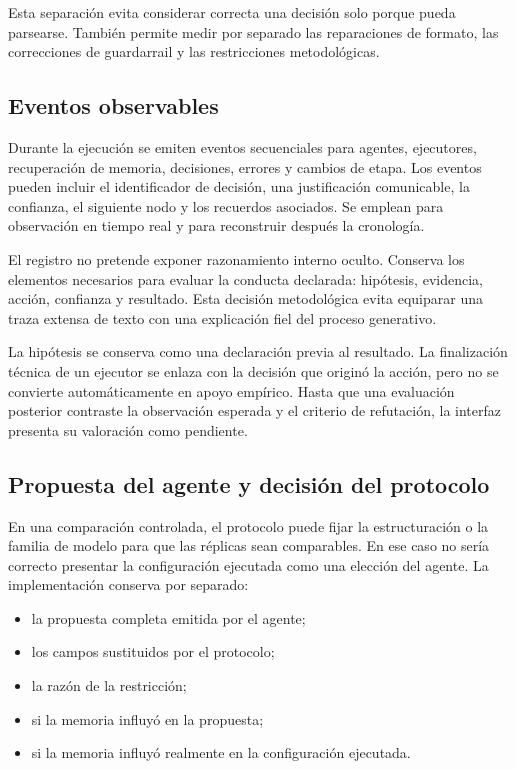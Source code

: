 Esta separación evita considerar correcta una decisión solo porque pueda
parsearse. También permite medir por separado las reparaciones de formato, las
correcciones de guardarrail y las restricciones metodológicas.

\subsection{Eventos observables}

Durante la ejecución se emiten eventos secuenciales para agentes, ejecutores,
recuperación de memoria, decisiones, errores y cambios de etapa. Los eventos
pueden incluir el identificador de decisión, una justificación comunicable, la
confianza, el siguiente nodo y los recuerdos asociados. Se emplean para
observación en tiempo real y para reconstruir después la cronología.

El registro no pretende exponer razonamiento interno oculto. Conserva los
elementos necesarios para evaluar la conducta declarada: hipótesis, evidencia,
acción, confianza y resultado. Esta decisión metodológica evita equiparar una
traza extensa de texto con una explicación fiel del proceso generativo.

La hipótesis se conserva como una declaración previa al resultado. La
finalización técnica de un ejecutor se enlaza con la decisión que originó la
acción, pero no se convierte automáticamente en apoyo empírico. Hasta que una
evaluación posterior contraste la observación esperada y el criterio de
refutación, la interfaz presenta su valoración como pendiente.

\subsection{Propuesta del agente y decisión del protocolo}

En una comparación controlada, el protocolo puede fijar la estructuración o la
familia de modelo para que las réplicas sean comparables. En ese caso no sería
correcto presentar la configuración ejecutada como una elección del agente. La
implementación conserva por separado:

\begin{itemize}
  \item la propuesta completa emitida por el agente;
  \item los campos sustituidos por el protocolo;
  \item la razón de la restricción;
  \item si la memoria influyó en la propuesta;
  \item si la memoria influyó realmente en la configuración ejecutada.
\end{itemize}

